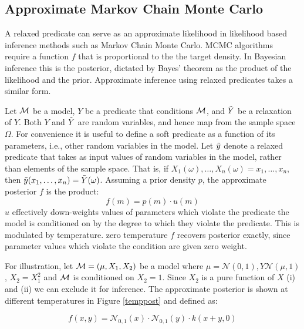 \subsection{Approximate Markov Chain Monte Carlo}
A relaxed predicate can serve as an approximate likelihood in likelihood based inference methods such as Markov Chain Monte Carlo.
MCMC algorithms require a function $f$ that is proportional to the the target density.
In Bayesian inference this is the posterior, dictated by Bayes' theorem as the product of the likelihood and the prior.
Approximate inference using relaxed predicates takes a similar form.

Let ${\mathcal{M}}$ be a model, $Y$ be a predicate that conditions ${\mathcal{M}}$, and $\tilde{Y}$ be a relaxation of $Y$.
Both $Y$ and $\tilde{Y}$ are random variables, and hence map from the sample space $\Omega$.
For convenience it is useful to define a soft predicate as a function of its parameters, i.e., other random variables in the model.
Let $\tilde{y}$ denote a relaxed predicate that takes as input values of random variables in the model, rather than elements of the sample space.
That is, if $X_1(\omega), \dots, X_n(\omega) = x_1, \dots, x_n$, then $\tilde{y}(x_1, \dots, x_n) = \tilde{Y}(\omega)$.
Assuming a prior density $p$, the approximate posterior $f$ is the product:
\begin{equation}
f(m) = p(m) \cdot u(m)
\end{equation}
$u$ effectively down-weights values of parameters which violate the predicate the model is conditioned on by the  degree to which they violate the predicate. 
This is modulated by temperature.  zero temperature $f$ recovers posterior exactly, since parameter values which violate the condition are given zero weight.

For illustration, let ${\mathcal{M}} = (\mu, X_1, X_2)$ be a model where $\mu = \mathcal{N}(0, 1), Y \mathcal{N}(\mu, 1)$, $X_2 = X_1^2$ and ${\mathcal{M}}$ is conditioned on $X_2 = 1$.
Since $X_2$ is a pure function of $X$ (i) and (ii) we can exclude it for inference.
The approximate posterior is shown at different temperatures in Figure \ref{temppost} and defined as:

\begin{equation}\label{approxposterior}
f(x, y) = \mathcal{N}_{0,1}(x) \cdot \mathcal{N}_{0,1}(y) \cdot k(x + y, 0) 
\end{equation}

